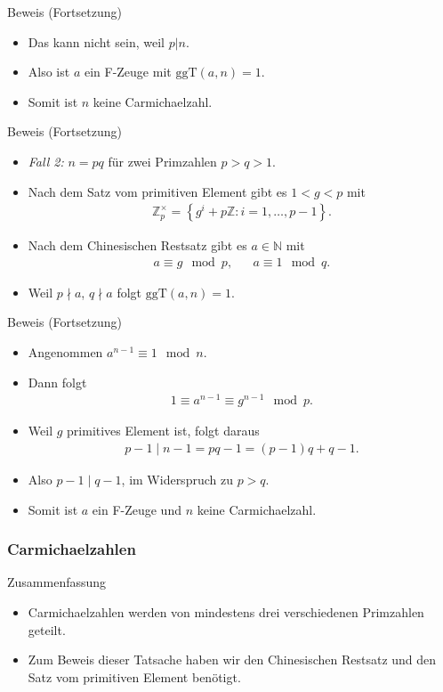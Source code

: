 \documentclass{beamer}
\renewcommand{\emph}[1]{{\textcolor{solarizedRed}{\itshape #1}}}
\newcommand\NN{\mathbb N}
\newcommand\ZZ{\mathbb Z}
\newcommand\cbc[1]{\left\{{#1}\right\}}
\newcommand{\ggt}{\mathrm{ggT}}
\renewcommand{\oe}{\"o}
\newcommand{\ue}{\"u}
\begin{document}
\begin{frame}
\begin{overprint}
\begin{block}{Beweis (Fortsetzung)}
\begin{itemize}
	\item Das kann nicht sein, weil $p|n$.
	\item Also ist $a$ ein F-Zeuge mit $\ggt(a,n)=1$.
	\item Somit ist $n$ keine Carmichaelzahl.
\end{itemize}
\end{block}
\begin{block}{Beweis (Fortsetzung)}
\begin{itemize}
	\item \emph{Fall 2:} $n=pq$ f\ue r zwei Primzahlen $p>q>1$.
	\item Nach dem Satz vom primitiven Element gibt es $1<g<p$ mit
		\begin{align*}
			\ZZ_p^\times=\cbc{g^i+p\ZZ:i=1,\ldots,p-1}.
		\end{align*}
	\item Nach dem Chinesischen Restsatz gibt es $a\in\NN$ mit
		\begin{align*}
			a\equiv g\mod p,&&a\equiv1\mod q.
		\end{align*}
	\item Weil $p\nmid a$, $q\nmid a$ folgt $\ggt(a,n)=1$.
\end{itemize}
\end{block}
\begin{block}{Beweis (Fortsetzung)}
\begin{itemize}
	\item Angenommen $a^{n-1}\equiv1\mod n$.
	\item Dann folgt
		\begin{align*}
			1\equiv a^{n-1}\equiv g^{n-1}\mod p.
		\end{align*}
	\item Weil $g$ primitives Element ist, folgt daraus
		\begin{align*}
			p-1\mid n-1=pq-1=(p-1)q+q-1.
		\end{align*}
	\item Also $p-1\mid q-1$, im Widerspruch zu $p>q$.
	\item Somit ist $a$ ein F-Zeuge und $n$ keine Carmichaelzahl.
\end{itemize}
\end{block}
\end{overprint}
\end{frame}

\begin{frame}\frametitle{Carmichaelzahlen}
\begin{block}{Zusammenfassung}
\begin{itemize}
\item Carmichaelzahlen werden von mindestens drei verschiedenen Primzahlen geteilt.
\item Zum Beweis dieser Tatsache haben wir den Chinesischen Restsatz und den Satz vom primitiven Element ben\oe tigt.
\end{itemize}
\end{block}
\end{frame}
\end{document}

